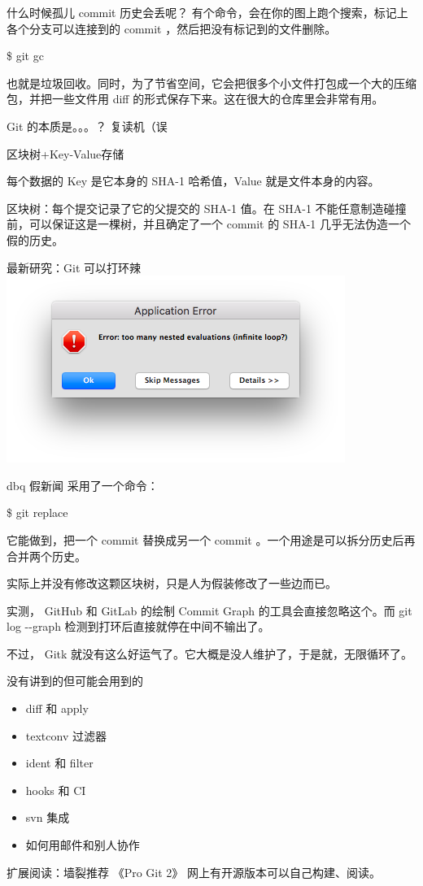 \documentclass{beamer}
\begin{document}
\begin{frame}{什么时候孤儿 commit 历史会丢呢？}
    有个命令，会在你的图上跑个搜索，标记上各个分支可以连接到的 commit ，然后把没有标记到的文件删除。

    \$ git gc

    也就是垃圾回收。同时，为了节省空间，它会把很多个小文件打包成一个大的压缩包，并把一些文件用 diff 的形式保存下来。这在很大的仓库里会非常有用。
\end{frame}

\begin{frame}{Git 的本质是。。。？}
    复读机（误

    区块树+Key-Value存储

    每个数据的 Key 是它本身的 SHA-1 哈希值，Value 就是文件本身的内容。

    区块树：每个提交记录了它的父提交的 SHA-1 值。在 SHA-1 不能任意制造碰撞前，可以保证这是一棵树，并且确定了一个 commit 的 SHA-1 几乎无法伪造一个假的历史。
\end{frame}

\begin{frame}{最新研究：Git 可以打环辣}
    \includegraphics[width=\linewidth]{2018-10-26-23-52-53.png}
\end{frame}

\begin{frame}{dbq 假新闻}
    采用了一个命令：

    \$ git replace

    它能做到，把一个 commit 替换成另一个 commit 。一个用途是可以拆分历史后再合并两个历史。

    实际上并没有修改这颗区块树，只是人为假装修改了一些边而已。

    实测， GitHub 和 GitLab 的绘制 Commit Graph 的工具会直接忽略这个。而 git log -{}-graph 检测到打环后直接就停在中间不输出了。

    不过， Gitk 就没有这么好运气了。它大概是没人维护了，于是就，无限循环了。
\end{frame}

\begin{frame}{没有讲到的但可能会用到的}
    \begin{itemize}
        \item diff 和 apply
        \item textconv 过滤器
        \item ident 和 filter
        \item hooks 和 CI
        \item svn 集成
        \item 如何用邮件和别人协作
    \end{itemize}

    扩展阅读：墙裂推荐 《Pro Git 2》 网上有开源版本可以自己构建、阅读。
\end{frame}
\end{document}
